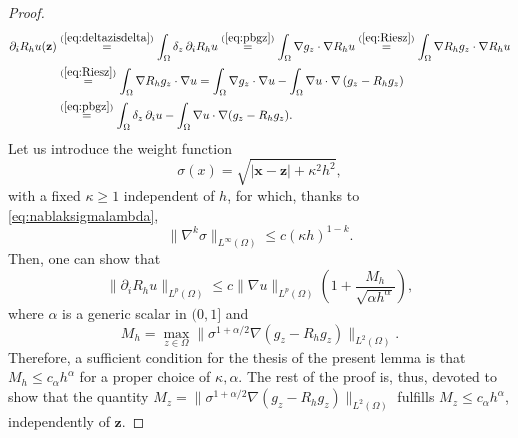 \documentclass[final,hidelinks]{siamart1116Arxiv}
\numberwithin{theorem}{section}
\newcommand{\sol}{{u}}
\begin{document}
\begin{proof}
 \begin{align}
  \partial_iR_h\sol(\mathbf z) &\overset{(\ref{eq:deltazisdelta})}{=} \int_\Omega\delta_z\,\partial_iR_h\sol \overset{(\ref{eq:pbgz})}{=} \int_\Omega\nabla g_z\cdot\nabla R_h\sol \overset{(\ref{eq:Riesz})}{=} \int_\Omega\nabla R_hg_z\cdot\nabla R_h\sol\\
  &\overset{(\ref{eq:Riesz})}{=} \int_\Omega\nabla R_hg_z\cdot\nabla\sol = \int_\Omega\nabla g_z\cdot\nabla \sol - \int_\Omega\nabla\sol\cdot\nabla\left(g_z-R_hg_z\right)\\ &\overset{(\ref{eq:pbgz})}{=} \int_\Omega\delta_z\,\partial_i\sol - \int_\Omega\nabla\sol\cdot\nabla(g_z-R_hg_z).
 \end{align}
 Let us introduce the weight function
 \begin{equation}
  \sigma(x) = \sqrt{|\mathbf x-\mathbf z|+\kappa^2h^2},
 \end{equation}
 with a fixed $\kappa\geq1$ independent of $h$, for which, thanks to \cref{eq:nablaksigmalambda},
 \begin{equation}\label{eq:nablaksigma}
  \|\nabla^k\sigma\|_{L^\infty(\Omega)} \leq c(\kappa h)^{1-k}.
 \end{equation}
 Then, one can show that \cite[(2.6)]{RannacherScott}
 \begin{equation}
  \|\partial_iR_h\sol\|_{L^p(\Omega)}\leq c\|\nabla\sol\|_{L^p(\Omega)}\left(1+\frac{M_h}{\sqrt{\alpha h^\alpha}}\right),
 \end{equation}
 where $\alpha$ is a generic scalar in $(0,1]$ and
 \begin{equation}
  M_h = \max_{z\in\Omega}\|\sigma^{1+\alpha/2}\nabla(g_z-R_hg_z)\|_{L^2(\Omega)}.
 \end{equation}
 Therefore, a sufficient condition for the thesis of the present lemma is that $M_h\leq c_\alpha h^\alpha$ for a proper choice of $\kappa,\alpha$.
 The rest of the proof is, thus, devoted to show that the quantity $M_z=\|\sigma^{1+\alpha/2}\nabla(g_z-R_hg_z)\|_{L^2(\Omega)}$ fulfills $M_z\leq c_\alpha h^\alpha$, independently of $\mathbf z$.
 

\end{proof}
\end{document}
